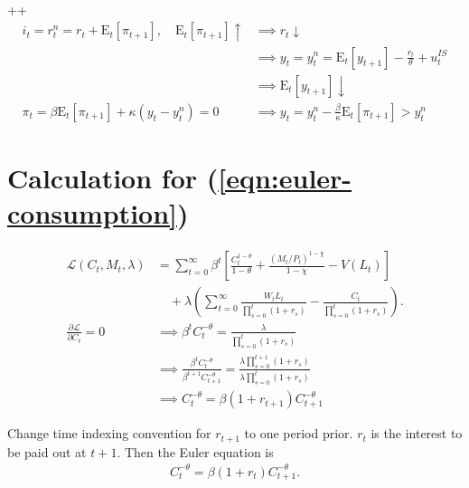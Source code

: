 \documentclass{article}
\newcommand{\Et}[1]{\mathrm{E}_t\left[#1\right]}
\renewcommand{\L}{\mathcal{L}}
\newcommand{\?}{\textcolor{red}{(?)}} %
\begin{document}
        ++
        \begin{align}
            i_t = r_t^n = r_t + \Et{\pi_{t+1}},
            \quad
            \Et{\pi_{t+1}} \uparrow
            &\implies
            r_t \downarrow
            \\
            &\implies
            y_t = y_t^n
            = \Et{y_{t+1}} - \frac{r_t}{\theta} + u_t^{IS}
            \\
            &\implies
            \Et{y_{t+1}} \downarrow
            \\
            \pi_t = \beta \Et{\pi_{t+1}} + \kappa (y_t - y_t^n) = 0
            &\implies
            y_t = y_t^n - \frac{\beta}{\kappa}\Et{\pi_{t+1}} > y_t^n
        \end{align}
        
    \newpage
    \appendix
    \section{Calculation for (\ref{eqn:euler-consumption})}\label{calc:euler-consumption}
        \begin{align}
            \L(C_t, M_t, \lambda)
            &= \sum_{t=0}^\infty \beta^t
            \left[
                \frac{C_t^{1-\theta}}{1-\theta}
                + \frac{(M_t/P_t)^{1-\chi}}{1-\chi}
                - V(L_t)
            \right] \\
            &\quad + \lambda \left(
                \sum_{t=0}^\infty \frac{W_t L_t}{\prod_{s=0}^{t}(1+r_s)} - \frac{C_t}{\prod_{s=0}^{t}(1+r_s)}
            \right).
            \\
            \frac{\partial\L}{\partial C_t} = 0
            &\implies \beta^t C_t^{-\theta}
            = \frac{\lambda}{\prod_{s=0}^{t}(1+r_s)}
            \\
            &\implies
            \frac{\beta^t C_t^{-\theta}}{\beta^{t+1} C_{t+1}^{-\theta}}
            =  \frac{\lambda \prod_{s=0}^{t+1}(1+r_s)}{\lambda \prod_{s=0}^{t}(1+r_s)}
            \\
            &\implies
            C_t^{-\theta}
            =  \beta (1+r_{t+1}) C_{t+1}^{-\theta}
        \end{align}
        
        Change time indexing convention for $r_{t+1}$ to one period prior. $r_{t}$ is the interest to be paid out at $t+1$. Then the Euler equation is
        \begin{align}
            C_t^{-\theta}
            =  \beta (1+r_t) C_{t+1}^{-\theta}.
        \end{align}
    
\end{document}
